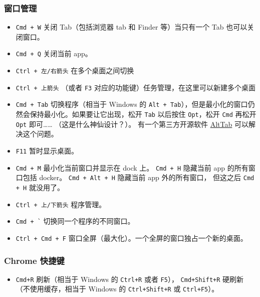 \subsubsection{窗口管理}
\begin{itemize}
\item \verb`Cmd + W` 关闭 Tab（包括浏览器 tab 和 Finder 等）当只有一个 Tab 也可以关闭窗口。
\item \verb`Cmd + Q` 关闭当前 app。
\item \verb`Ctrl + 左/右箭头` 在多个桌面之间切换
\item \verb`Ctrl + 上箭头` （或者 \verb`F3` 对应的功能键）任务管理，在这里可以新建多个桌面
\item \verb`Cmd + Tab` 切换程序（相当于 Windows 的 \verb`Alt + Tab`），但是最小化的窗口仍然会保持最小化。如果要让它出现，松开 \verb`Tab` 以后按住 \verb`Opt`，松开 \verb`Cmd` 再松开 \verb`Opt` 即可…… （这是什么神仙设计？）。 有一个第三方开源软件 \href{https://alt-tab-macos.netlify.app/}{AltTab} 可以解决这个问题。
\item \verb`F11` 暂时显示桌面。
\item \verb`Cmd + M` 最小化当前窗口并显示在 dock 上。 \verb`Cmd + H` 隐藏当前 app 的所有窗口包括 docker。 \verb`Cmd + Alt + H` 隐藏当前 app 外的所有窗口， 但这之后 \verb`Cmd + H` 就没用了。
\item \verb`Ctrl + 上/下箭头` 程序管理。
\item \verb|Cmd + `| 切换同一个程序的不同窗口。
\item \verb`Ctrl + Cmd + F` 窗口全屏（最大化）。一个全屏的窗口独占一个新的桌面。
\end{itemize}

\subsubsection{Chrome 快捷键}
\begin{itemize}
\item \verb`Cmd+R` 刷新（相当于 Windows 的 \verb`Ctrl+R` 或者 \verb`F5`）， \verb`Cmd+Shift+R` 硬刷新（不使用缓存，相当于 Windows 的 \verb`Ctrl+Shift+R` 或 \verb`Ctrl+F5`）。
\end{itemize}

